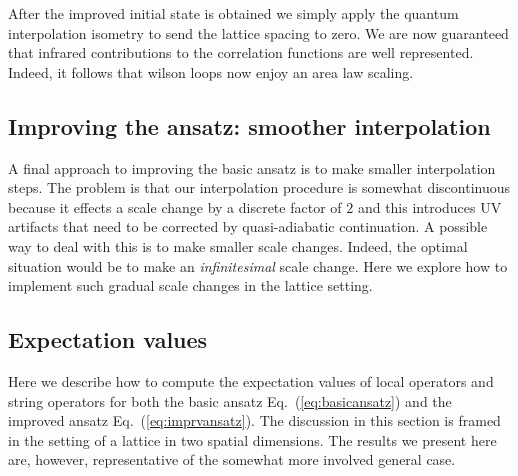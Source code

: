 \documentclass[twocolumn,lengthcheck,superscriptaddress]{revtex4-1}
\theoremstyle{definition}
\theoremstyle{remark}
\begin{document}
After the improved initial state is obtained we simply apply the quantum interpolation isometry to send the lattice spacing to zero. We are now guaranteed that infrared contributions to the correlation functions are well represented. Indeed, it follows that wilson loops now enjoy an area law scaling. 

\subsection{Improving the ansatz: smoother interpolation}
A final approach to improving the basic ansatz is to make smaller interpolation steps. The problem is that our interpolation procedure is somewhat discontinuous because it effects a scale change by a discrete factor of $2$ and this introduces UV artifacts that need to be corrected by quasi-adiabatic continuation. A possible way to deal with this is to make smaller scale changes. Indeed, the optimal situation would be to make an \emph{infinitesimal} scale change. Here we explore how to implement such gradual scale changes in the lattice setting. 

\subsection{Expectation values}
Here we describe how to compute the expectation values of local operators and string operators for both the basic ansatz Eq.~(\ref{eq:basicansatz}) and the improved ansatz Eq.~(\ref{eq:imprvansatz}). The discussion in this section is framed in the setting of a lattice in two spatial dimensions. The results we present here are, however, representative of the somewhat more involved general case.
\end{document}
